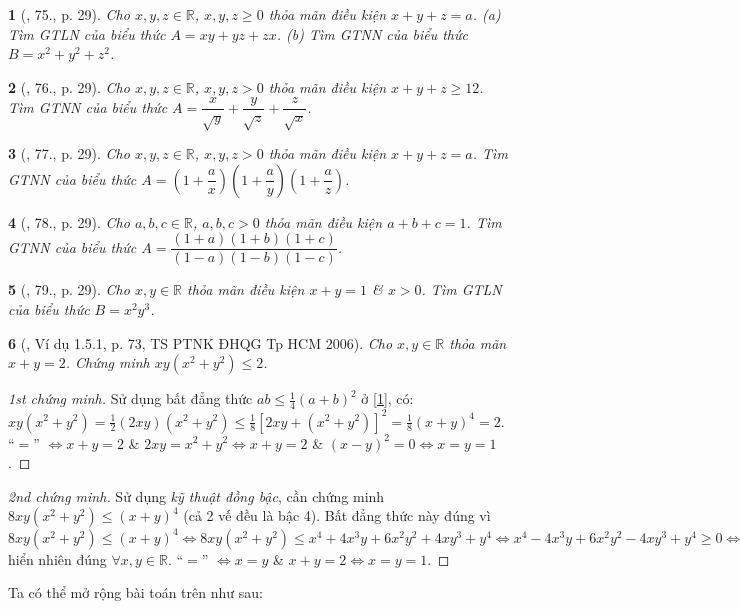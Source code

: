 \documentclass{article}
\newtheorem{baitoan}{}
\begin{document}
\begin{baitoan}[\cite{Tuyen_Toan_9_old}, 75., p. 29]
	Cho $x,y,z\in\mathbb{R}$, $x,y,z\ge0$ thỏa mãn điều kiện $x + y + z = a$. (a) Tìm {\rm GTLN} của biểu thức $A = xy + yz + zx$. (b) Tìm {\rm GTNN} của biểu thức $B = x^2 + y^2 + z^2$.
\end{baitoan}

\begin{baitoan}[\cite{Tuyen_Toan_9_old}, 76., p. 29]
	Cho $x,y,z\in\mathbb{R}$, $x,y,z > 0$ thỏa mãn điều kiện $x + y + z\ge12$. Tìm {\rm GTNN} của biểu thức $A = \dfrac{x}{\sqrt{y}} + \dfrac{y}{\sqrt{z}} + \dfrac{z}{\sqrt{x}}$.
\end{baitoan}

\begin{baitoan}[\cite{Tuyen_Toan_9_old}, 77., p. 29]
	Cho $x,y,z\in\mathbb{R}$, $x,y,z > 0$ thỏa mãn điều kiện $x + y + z = a$. Tìm {\rm GTNN} của biểu thức $A = \left(1 + \dfrac{a}{x}\right)\left(1 + \dfrac{a}{y}\right)\left(1 + \dfrac{a}{z}\right)$.
\end{baitoan}

\begin{baitoan}[\cite{Tuyen_Toan_9_old}, 78., p. 29]
	Cho $a,b,c\in\mathbb{R}$, $a,b,c > 0$ thỏa mãn điều kiện $a + b + c = 1$. Tìm {\rm GTNN} của biểu thức $A = \dfrac{(1 + a)(1 + b)(1 + c)}{(1 - a)(1 - b)(1 - c)}$.
\end{baitoan}

\begin{baitoan}[\cite{Tuyen_Toan_9_old}, 79., p. 29]
	Cho $x,y\in\mathbb{R}$ thỏa mãn điều kiện $x + y = 1$ \& $x > 0$. Tìm {\rm GTLN} của biểu thức $B = x^2y^3$.
\end{baitoan}

\begin{baitoan}[\cite{Dung_Can_Anh_bdt_8_9}, Ví dụ 1.5.1, p. 73, TS PTNK ĐHQG Tp HCM 2006]
	Cho $x,y\in\mathbb{R}$ thỏa mãn $x + y = 2$. Chứng minh $xy(x^2 + y^2)\le2$.
\end{baitoan}

\begin{proof}[1st chứng minh]
	Sử dụng bất đẳng thức $ab\le\frac{1}{4}(a + b)^2$ ở \eqref{1}, có: $xy(x^2 + y^2) = \frac{1}{2}(2xy)(x^2 + y^2)\le\frac{1}{8}[2xy + (x^2 + y^2)]^2 = \frac{1}{8}(x + y)^4 = 2$. ``$=$'' $\Leftrightarrow x + y = 2$ \& $2xy = x^2 + y^2\Leftrightarrow x + y = 2$ \& $(x - y)^2 = 0\Leftrightarrow x = y = 1$.
\end{proof}

\begin{proof}[2nd chứng minh]
	Sử dụng \textit{kỹ thuật đồng bậc}, cần chứng minh $8xy(x^2 + y^2)\le(x + y)^4$ (cả 2 vế đều là bậc 4). Bất đẳng thức này đúng vì $8xy(x^2 + y^2)\le(x + y)^4\Leftrightarrow8xy(x^2 + y^2)\le x^4 + 4x^3y + 6x^2y^2 + 4xy^3 + y^4\Leftrightarrow x^4 - 4x^3y + 6x^2y^2 - 4xy^3 + y^4\ge0\Leftrightarrow(x - y)^4\ge0$ hiển nhiên đúng $\forall x,y\in\mathbb{R}$. ``$=$'' $\Leftrightarrow x = y$ \& $x + y = 2\Leftrightarrow x = y = 1$.
\end{proof}
Ta có thể mở rộng bài toán trên như sau:
\end{document}
